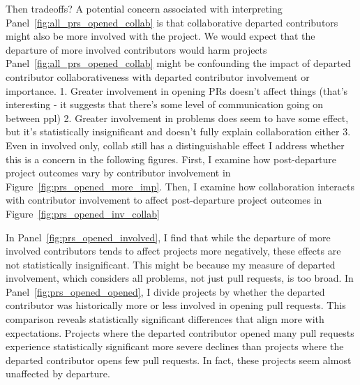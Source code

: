 \documentclass[12pt,notitlepage]{article}
\begin{document}
Then tradeoffs? 
A potential concern associated with interpreting Panel~\ref{fig:all_prs_opened_collab} is that collaborative departed contributors might also be more involved with the project. We would expect that the departure of more involved contributors would harm projects Panel~\ref{fig:all_prs_opened_collab} might be confounding the impact of departed contributor collaborativeness with departed contributor involvement or importance. 
1. Greater involvement in opening PRs doesn't affect things (that's interesting - it suggests that there's some level of communication going on between ppl)
2. Greater involvement in problems does seem to have some effect, but it's statistically insignificant and doesn't fully explain collaboration either
3. Even in involved only, collab still has a distinguishable effect
I address whether this is a concern in the following figures. First, I examine how post-departure project outcomes vary by contributor involvement in Figure~\ref{fig:prs_opened_more_imp}. Then, I examine how collaboration interacts with contributor involvement to affect post-departure project outcomes in Figure~\ref{fig:prs_opened_inv_collab}


In Panel~\ref{fig:prs_opened_involved}, I find that while the departure of more involved contributors tends to affect projects more negatively, these effects are not statistically insignificant. This might be because my measure of departed involvement, which considers all problems, not just pull requests, is too broad. In Panel~\ref{fig:prs_opened_opened}, I divide projects by whether the departed contributor was historically more or less involved in opening pull requests. This comparison reveals statistically significant differences that align more with expectations. Projects where the departed contributor opened many pull requests experience statistically significant more severe declines than projects where the departed contributor opens few pull requests. In fact, these projects seem almost unaffected by departure. 
\end{document}
